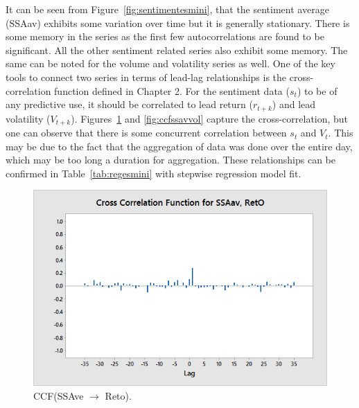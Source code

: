 It can be seen from Figure~\ref{fig:sentimentesmini}, that the sentiment average (SSAav) exhibits some variation over time but it is generally stationary. There is some memory in the series as the first few autocorrelations are found to be significant. All the other sentiment related series also exhibit some memory. The same can be noted for the volume and volatility series as well. One of the key tools to connect two series in terms of lead-lag relationships is the cross-correlation function defined in Chapter 2. For the sentiment data ($s_t$) to be of any predictive use, it should be correlated to lead return ($r_{t+k}$) and lead volatility ($V_{t+k}$). Figures~\ref{fig:ccfssavreto} and \ref{fig:ccfssavvol} capture the cross-correlation, but one can observe that there is some concurrent correlation between $s_t$ and $V_t$. This may be due to the fact that the aggregation of data was done over the entire day, which may be too long a duration for aggregation. These relationships can be confirmed in Table~\ref{tab:regesmini} with stepwise regression model fit. 

	\begin{figure}[!ht]
	\centering
	\includegraphics[width=\textwidth]{chapters/chapter_news_an/figures/ch4sec4crossfssaavreto} 
	\caption{CCF(SSAve $\rightarrow$ Reto). \label{fig:ccfssavreto}}
	\end{figure}

